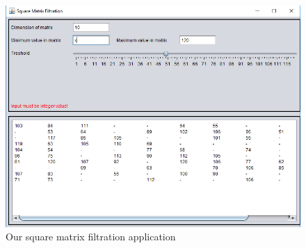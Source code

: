 \documentclass[12pt]{report}
\begin{document}
\begin{figure}[!ht]
\centering
\includegraphics[width=.8\linewidth]{img/application.PNG}
\caption{Our square matrix filtration application}
\label{fig:app}
\end{figure}
\end{document}
